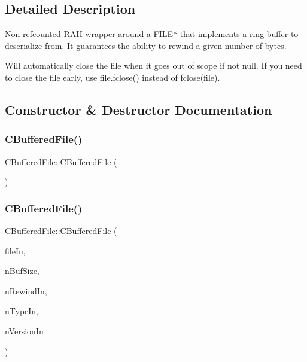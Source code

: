 \subsection{Detailed Description}
Non-\/refcounted R\+A\+II wrapper around a F\+I\+L\+E$\ast$ that implements a ring buffer to deserialize from. It guarantees the ability to rewind a given number of bytes.

Will automatically close the file when it goes out of scope if not null. If you need to close the file early, use file.\+fclose() instead of fclose(file). 

\subsection{Constructor \& Destructor Documentation}
\mbox{\label{class_c_buffered_file_a9d6a1d43da82fe5fb30500cd56032134}} 
\subsubsection{\texorpdfstring{C\+Buffered\+File()}{CBufferedFile()}\hspace{0.1cm}{\footnotesize\ttfamily [1/2]}}
{\footnotesize\ttfamily C\+Buffered\+File\+::\+C\+Buffered\+File (\begin{DoxyParamCaption}\item[{const \mbox{\hyperlink{class_c_buffered_file}{C\+Buffered\+File}} \&}]{ }\end{DoxyParamCaption})\hspace{0.3cm}{\ttfamily [private]}}

\mbox{\label{class_c_buffered_file_a30ad96a8d09bed60355d1fadda7dabdc}} 
\subsubsection{\texorpdfstring{C\+Buffered\+File()}{CBufferedFile()}\hspace{0.1cm}{\footnotesize\ttfamily [2/2]}}
{\footnotesize\ttfamily C\+Buffered\+File\+::\+C\+Buffered\+File (\begin{DoxyParamCaption}\item[{F\+I\+LE $\ast$}]{file\+In,  }\item[{uint64\+\_\+t}]{n\+Buf\+Size,  }\item[{uint64\+\_\+t}]{n\+Rewind\+In,  }\item[{int}]{n\+Type\+In,  }\item[{int}]{n\+Version\+In }\end{DoxyParamCaption})\hspace{0.3cm}{\ttfamily [inline]}}

